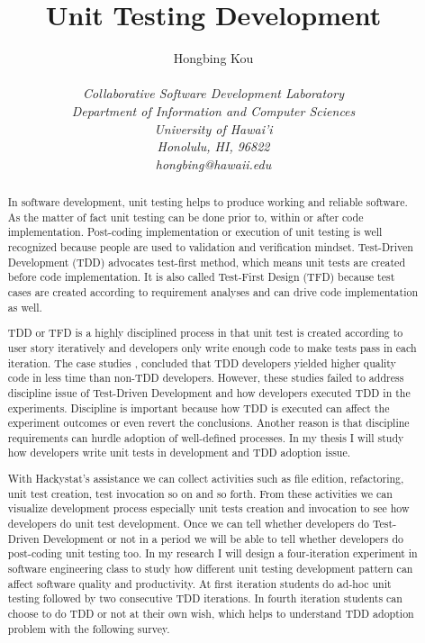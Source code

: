 \documentclass[11pt,twocolumn]{article}
\begin{document}
\title{Unit Testing Development}
\author{\protect\begin{tabular}{ccc}
Hongbing Kou\\
\end{tabular}\\
\em Collaborative Software Development Laboratory\\
\em Department of Information and Computer Sciences\\
\em University of Hawai'i\\
\em Honolulu, HI, 96822\\
\em hongbing@hawaii.edu}
\maketitle
\thispagestyle{empty}

\begin{abstract}
  In software development, unit testing helps to produce working and
  reliable software. As the matter of fact unit testing can be done prior
  to, within or after code implementation. Post-coding implementation or
  execution of unit testing is well recognized because people are used to
  validation and verification mindset. Test-Driven Development (TDD)
  advocates test-first method, which means unit tests are created before
  code implementation. It is also called Test-First Design (TFD) because
  test cases are created according to requirement analyses and can
  drive code implementation as well.
  
  TDD or TFD is a highly disciplined process in that unit test is created
  according to user story iteratively and developers only write enough code
  to make tests pass in each iteration. The case studies
  \cite{George:2003}, \cite{Maximilien:2003} concluded that TDD developers
  yielded higher quality code in less time than non-TDD developers.
  However, these studies failed to address discipline issue of Test-Driven
  Development and how developers executed TDD in the experiments.
  Discipline is important because how TDD is executed can affect the
  experiment outcomes or even revert the conclusions. Another reason is
  that discipline requirements can hurdle adoption of well-defined
  processes. In my thesis I will study how developers write unit tests in
  development and TDD adoption issue.
  
  With Hackystat's assistance we can collect activities such as file
  edition, refactoring, unit test creation, test invocation so on and so
  forth. From these activities we can visualize development process
  especially unit tests creation and invocation to see how developers do
  unit test development. Once we can tell whether developers do Test-Driven
  Development or not in a period we will be able to tell whether developers
  do post-coding unit testing too. In my research I will design a
  four-iteration experiment in software engineering class to study how
  different unit testing development pattern can affect software quality
  and productivity. At first iteration students do ad-hoc unit testing
  followed by two consecutive TDD iterations. In fourth iteration students
  can choose to do TDD or not at their own wish, which helps to understand
  TDD adoption problem with the following survey.
  

\end{abstract}
\end{document}
